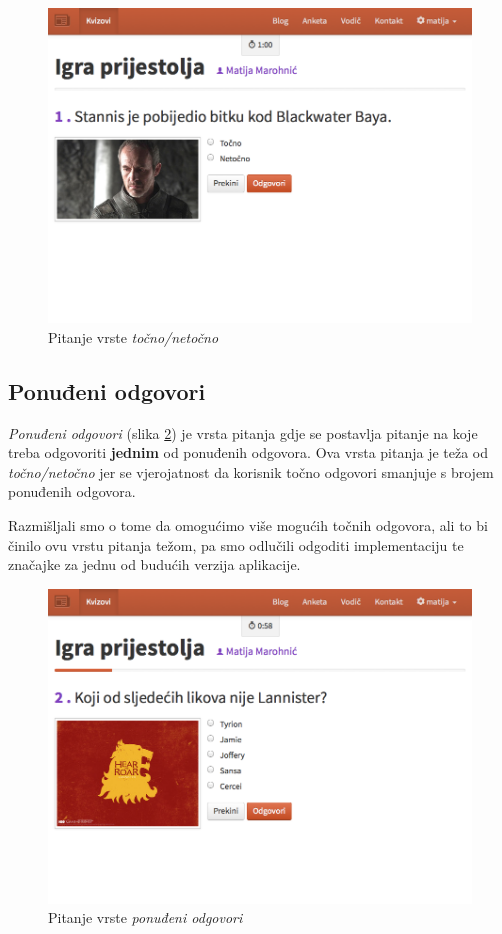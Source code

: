 \documentclass[11pt]{scrreprt}
\begin{document}
\begin{figure}[H]
  \includegraphics[width=\textwidth, clip=true, trim=0 7cm 0 0, fbox]{student/boolean_question}
  \caption{Pitanje vrste \emph{točno/netočno}}
  \label{fig:boolean}
\end{figure}

\subsection{Ponuđeni odgovori}

\emph{Ponuđeni odgovori} (slika \ref{fig:choice}) je vrsta pitanja gdje se
postavlja pitanje na koje treba odgovoriti \textbf{jednim} od ponuđenih
odgovora. Ova vrsta pitanja je teža od \emph{točno/netočno} jer se vjerojatnost
da korisnik točno odgovori smanjuje s brojem ponuđenih odgovora.

Razmišljali smo o tome da omogućimo više mogućih točnih odgovora, ali to bi
činilo ovu vrstu pitanja težom, pa smo odlučili odgoditi implementaciju te
značajke za jednu od budućih verzija aplikacije.

\begin{figure}[H]
  \includegraphics[width=\textwidth, clip=true, trim=0 5cm 0 0, fbox]{student/choice_question}
  \caption{Pitanje vrste \emph{ponuđeni odgovori}}
  \label{fig:choice}
\end{figure}
\end{document}
